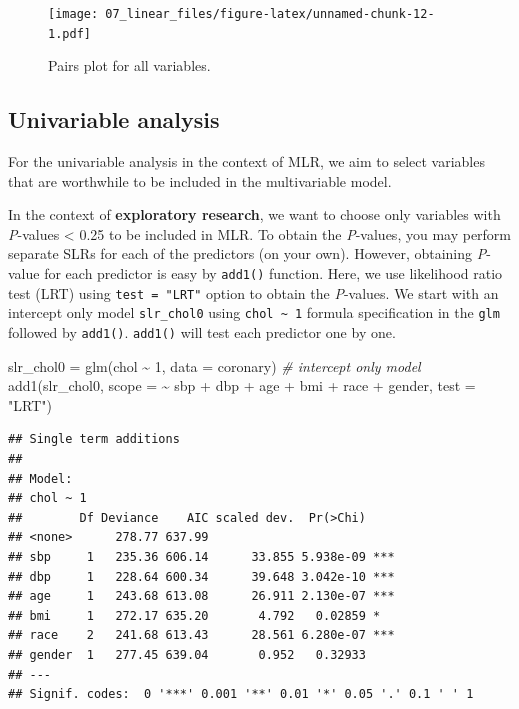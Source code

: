 \documentclass[
  10pt,
]{krantz}
\newenvironment{Shaded}{\begin{snugshade}}{\end{snugshade}}
\newcommand{\AttributeTok}[1]{\textcolor[rgb]{0.77,0.63,0.00}{#1}}
\newcommand{\CommentTok}[1]{\textcolor[rgb]{0.56,0.35,0.01}{\textit{#1}}}
\newcommand{\DecValTok}[1]{\textcolor[rgb]{0.00,0.00,0.81}{#1}}
\newcommand{\FunctionTok}[1]{\textcolor[rgb]{0.00,0.00,0.00}{#1}}
\newcommand{\NormalTok}[1]{#1}
\newcommand{\OtherTok}[1]{\textcolor[rgb]{0.56,0.35,0.01}{#1}}
\newcommand{\SpecialCharTok}[1]{\textcolor[rgb]{0.00,0.00,0.00}{#1}}
\newcommand{\StringTok}[1]{\textcolor[rgb]{0.31,0.60,0.02}{#1}}
\begin{document}
\begin{figure}
\centering
\texttt{[image: 07\_linear\_files/figure-latex/unnamed-chunk-12-1.pdf]}
\caption{\label{fig:unnamed-chunk-12}Pairs plot for all variables.}
\end{figure}

\hypertarget{univariable-analysis-1}{%
\subsection{Univariable analysis}\label{univariable-analysis-1}}

For the univariable analysis in the context of MLR, we aim to select variables that are worthwhile to be included in the multivariable model.

In the context of \textbf{exploratory research}, we want to choose only variables with \emph{P}-values \textless{} 0.25 to be included in MLR. To obtain the \emph{P}-values, you may perform separate SLRs for each of the predictors (on your own). However, obtaining \emph{P}-value for each predictor is easy by \texttt{add1()} function. Here, we use likelihood ratio test (LRT) using \texttt{test\ =\ "LRT"} option to obtain the \emph{P}-values. We start with an intercept only model \texttt{slr\_chol0} using \texttt{chol\ \textasciitilde{}\ 1} formula specification in the \texttt{glm} followed by \texttt{add1()}. \texttt{add1()} will test each predictor one by one.

\begin{Shaded}
\begin{Highlighting}[]
\NormalTok{slr\_chol0 }\OtherTok{=} \FunctionTok{glm}\NormalTok{(chol }\SpecialCharTok{\textasciitilde{}} \DecValTok{1}\NormalTok{, }\AttributeTok{data =}\NormalTok{ coronary)  }\CommentTok{\# intercept only model}
\FunctionTok{add1}\NormalTok{(slr\_chol0, }\AttributeTok{scope =} \SpecialCharTok{\textasciitilde{}}\NormalTok{ sbp }\SpecialCharTok{+}\NormalTok{ dbp }\SpecialCharTok{+}\NormalTok{ age }\SpecialCharTok{+}\NormalTok{ bmi }\SpecialCharTok{+}\NormalTok{ race }\SpecialCharTok{+}\NormalTok{ gender, }
     \AttributeTok{test =} \StringTok{"LRT"}\NormalTok{)}
\end{Highlighting}
\end{Shaded}

\begin{verbatim}
## Single term additions
## 
## Model:
## chol ~ 1
##        Df Deviance    AIC scaled dev.  Pr(>Chi)    
## <none>      278.77 637.99                          
## sbp     1   235.36 606.14      33.855 5.938e-09 ***
## dbp     1   228.64 600.34      39.648 3.042e-10 ***
## age     1   243.68 613.08      26.911 2.130e-07 ***
## bmi     1   272.17 635.20       4.792   0.02859 *  
## race    2   241.68 613.43      28.561 6.280e-07 ***
## gender  1   277.45 639.04       0.952   0.32933    
## ---
## Signif. codes:  0 '***' 0.001 '**' 0.01 '*' 0.05 '.' 0.1 ' ' 1
\end{verbatim}
\end{document}
